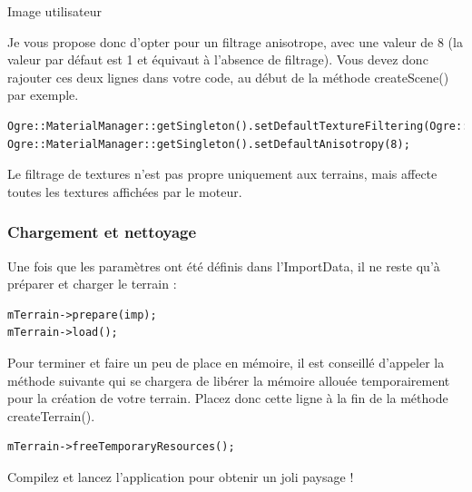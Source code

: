 Image utilisateur

Je vous propose donc d'opter pour un filtrage anisotrope, avec une valeur de 8 (la valeur par d\'efaut est 1 et \'equivaut \`a l'absence de filtrage). Vous devez donc rajouter ces deux lignes dans votre code, au d\'ebut de la m\'ethode createScene() par exemple.

\begin{lstlisting}[caption={Choix d'un filtrage anisotrope}]
Ogre::MaterialManager::getSingleton().setDefaultTextureFiltering(Ogre::TFO\_ANISOTROPIC);
Ogre::MaterialManager::getSingleton().setDefaultAnisotropy(8);
\end{lstlisting}

Le filtrage de textures n'est pas propre uniquement aux terrains, mais affecte toutes les textures affich\'ees par le moteur.


\subsubsection{Chargement et nettoyage}


Une fois que les param\`etres ont \'et\'e d\'efinis dans l'ImportData, il ne reste qu'\`a pr\'eparer et charger le terrain :

\begin{lstlisting}[caption={Pr\'eparation et chargement du terrain}]
mTerrain->prepare(imp);
mTerrain->load();
\end{lstlisting}

Pour terminer et faire un peu de place en m\'emoire, il est conseill\'e d'appeler la m\'ethode suivante qui se chargera de lib\'erer la m\'emoire allou\'ee temporairement pour la cr\'eation de votre terrain. Placez donc cette ligne \`a la fin de la m\'ethode createTerrain().

\begin{lstlisting}[caption={Lib\'eration de place en m\'emoire}]
mTerrain->freeTemporaryResources();
\end{lstlisting}

Compilez et lancez l'application pour obtenir un joli paysage !
































